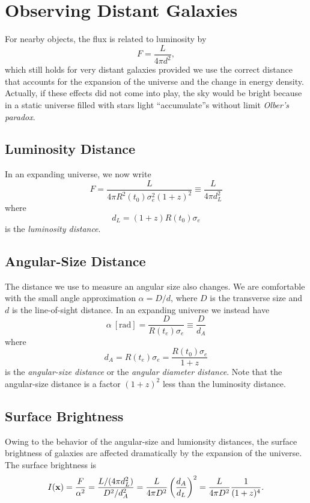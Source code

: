 \documentclass[]{article}
\begin{document}
\section{Observing Distant Galaxies}

For nearby objects, the flux is related to luminosity by
\begin{equation}
F = \frac{L}{4\pi d^2},
\end{equation}
\noindent
which still holds for very distant galaxies provided we
use the correct distance that accounts for the expansion
of the universe and the change in energy density.  Actually,
if these effects did not come into play, the sky would be
bright because in a static universe filled with stars light
``accumulate''s without limit {\it Olber's paradox}.

\subsection{Luminosity Distance}
In an expanding universe, we now write
\begin{equation}
F = \frac{L}{4\pi R^2(t_0)\sigma_e^2(1+z)^2} \equiv \frac{L}{4\pi d_L^2}
\end{equation}
\noindent
where
\begin{equation}
d_L = (1+z) R(t_0) \sigma_e
\end{equation}
\noindent
is the {\it luminosity distance}.

\subsection{Angular-Size Distance}
The distance we use to measure an angular size also changes.
We are comfortable with the small angle approximation $\alpha = D/d$,
where $D$ is the transverse size and $d$ is the line-of-sight distance.
In an expanding universe we instead have
\begin{equation}
\alpha~[\mathrm{rad}] = \frac{D}{R(t_e)\sigma_e}\equiv\frac{D}{d_A}
\end{equation}
\noindent
where
\begin{equation}
d_A = R(t_e) \sigma_e = \frac{R(t_0) \sigma_e}{1+z}
\end{equation}
\noindent
is the {\it angular-size distance} or the {\it angular diameter distance}.
Note that the angular-size distance is a factor $(1+z)^2$ less than the
luminosity distance.

\subsection{Surface Brightness}
Owing to the behavior of the angular-size and lumionsity distances,
the surface brightness of galaxies are affected dramatically by the
expansion of the universe.  The surface brightness is
\begin{equation}
I(\mathbf{x}) = \frac{F}{\alpha^2} = \frac{L/(4\pi d_L^2)}{D^2 / d_A^2} = \frac{L}{4\pi D^2}\left(\frac{d_A}{d_L}\right)^2 = \frac{L}{4\pi D^2}\frac{1}{(1+z)^4}.
\end{equation}
\end{document}
